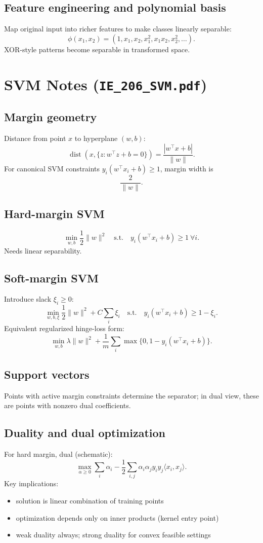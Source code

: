 \documentclass[11pt]{article}
\newcommand{\1}{\mathbf{1}}
\begin{document}
\subsection*{Feature engineering and polynomial basis}
Map original input into richer features to make classes linearly separable:
\[
\phi(x_1,x_2)=(1,x_1,x_2,x_1^2,x_1x_2,x_2^2,\dots).
\]
XOR-style patterns become separable in transformed space.

\section{SVM Notes (\texttt{IE\_206\_SVM.pdf})}
\subsection*{Margin geometry}
Distance from point $x$ to hyperplane $(w,b)$:
\[
\operatorname{dist}(x,\{z:w^\top z+b=0\})=\frac{|w^\top x+b|}{\|w\|}.
\]
For canonical SVM constraints $y_i(w^\top x_i+b)\ge1$, margin width is
\[
\frac{2}{\|w\|}.
\]

\subsection*{Hard-margin SVM}
\[
\min_{w,b}\frac12\|w\|^2
\quad\text{s.t.}\quad
y_i(w^\top x_i+b)\ge1\ \forall i.
\]
Needs linear separability.

\subsection*{Soft-margin SVM}
Introduce slack $\xi_i\ge0$:
\[
\min_{w,b,\xi}\frac12\|w\|^2 + C\sum_i\xi_i
\quad\text{s.t.}\quad
y_i(w^\top x_i+b)\ge1-\xi_i.
\]
Equivalent regularized hinge-loss form:
\[
\min_{w,b}\lambda\|w\|^2+\frac1m\sum_i\max\{0,1-y_i(w^\top x_i+b)\}.
\]

\subsection*{Support vectors}
Points with active margin constraints determine the separator; in dual view, these are points with nonzero dual coefficients.

\subsection*{Duality and dual optimization}
For hard margin, dual (schematic):
\[
\max_{\alpha\ge0}\sum_i\alpha_i-\frac12\sum_{i,j}\alpha_i\alpha_j y_i y_j\langle x_i,x_j\rangle.
\]
Key implications:
\begin{itemize}
\item solution is linear combination of training points
\item optimization depends only on inner products (kernel entry point)
\item weak duality always; strong duality for convex feasible settings
\end{itemize}
\end{document}
